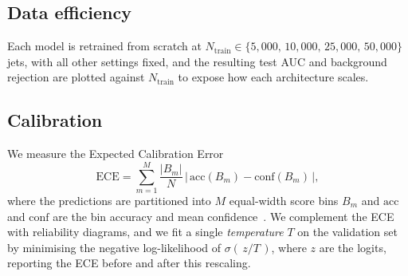 \subsection{Data efficiency}
Each model is retrained from scratch at
$N_{\text{train}}\in\{5{,}000,\,10{,}000,\,25{,}000,\,50{,}000\}$ jets, with
all other settings fixed, and the resulting test AUC and background rejection
are plotted against $N_{\text{train}}$ to expose how each architecture scales.

\subsection{Calibration}
We measure the Expected Calibration Error
\begin{equation}
\mathrm{ECE}=\sum_{m=1}^{M}\frac{|B_m|}{N}\,
\bigl|\,\mathrm{acc}(B_m)-\mathrm{conf}(B_m)\,\bigr|,
\label{eq:ece}
\end{equation}
where the predictions are partitioned into $M$ equal-width score bins $B_m$
and $\mathrm{acc}$ and $\mathrm{conf}$ are the bin accuracy and mean
confidence~\citep{guo2017calibration}. We complement the ECE with reliability
diagrams, and we fit a single \emph{temperature} $T$ on the validation set by
minimising the negative log-likelihood of $\sigma(\,z/T\,)$, where $z$ are
the logits, reporting the ECE before and after this rescaling.
